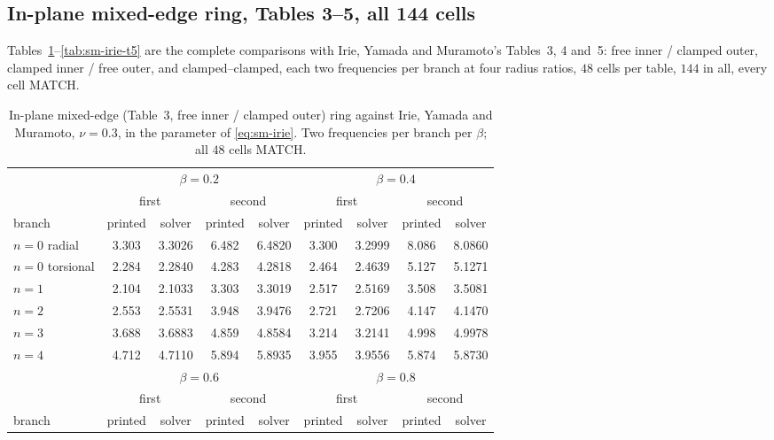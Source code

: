 \documentclass[11pt]{article}
\begin{document}
\subsection{In-plane mixed-edge ring, Tables 3--5, all 144 cells}\label{sec:sm-irie-mixed}
Tables~\ref{tab:sm-irie-t3}--\ref{tab:sm-irie-t5} are the complete
comparisons with Irie, Yamada and Muramoto's Tables~3, 4 and~5: free inner
/ clamped outer, clamped inner / free outer, and clamped--clamped, each two
frequencies per branch at four radius ratios, $48$ cells per table, $144$
in all, every cell MATCH.

\begin{center}\footnotesize
\begin{longtable}{lcccccccc}
\caption{In-plane mixed-edge (Table~3, free inner / clamped outer) ring against Irie, Yamada and Muramoto, $\nu=0.3$, in the parameter of \eqref{eq:sm-irie}. Two frequencies per branch per $\beta$; all $48$ cells MATCH.}
\label{tab:sm-irie-t3}\\
\toprule
& \multicolumn{4}{c}{$\beta=0.2$} & \multicolumn{4}{c}{$\beta=0.4$}\\
\cmidrule(lr){2-5}\cmidrule(lr){6-9}
& \multicolumn{2}{c}{first} & \multicolumn{2}{c}{second} & \multicolumn{2}{c}{first} & \multicolumn{2}{c}{second}\\
branch & printed & solver & printed & solver & printed & solver & printed & solver\\
\midrule
$n=0$ radial & 3.303 & 3.3026 & 6.482 & 6.4820 & 3.300 & 3.2999 & 8.086 & 8.0860 \\
$n=0$ torsional & 2.284 & 2.2840 & 4.283 & 4.2818 & 2.464 & 2.4639 & 5.127 & 5.1271 \\
$n=1$ & 2.104 & 2.1033 & 3.303 & 3.3019 & 2.517 & 2.5169 & 3.508 & 3.5081 \\
$n=2$ & 2.553 & 2.5531 & 3.948 & 3.9476 & 2.721 & 2.7206 & 4.147 & 4.1470 \\
$n=3$ & 3.688 & 3.6883 & 4.859 & 4.8584 & 3.214 & 3.2141 & 4.998 & 4.9978 \\
$n=4$ & 4.712 & 4.7110 & 5.894 & 5.8935 & 3.955 & 3.9556 & 5.874 & 5.8730 \\
\midrule
& \multicolumn{4}{c}{$\beta=0.6$} & \multicolumn{4}{c}{$\beta=0.8$}\\
\cmidrule(lr){2-5}\cmidrule(lr){6-9}
& \multicolumn{2}{c}{first} & \multicolumn{2}{c}{second} & \multicolumn{2}{c}{first} & \multicolumn{2}{c}{second}\\
branch & printed & solver & printed & solver & printed & solver & printed & solver\\

\end{longtable}
\end{center}
\end{document}
